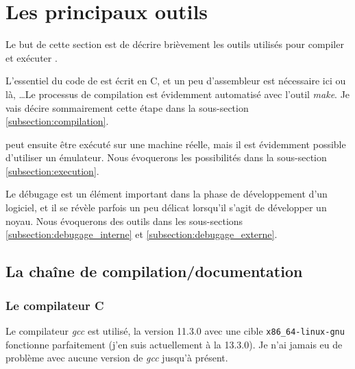 %
\section{Les principaux outils}
\label{section:outils}

   Le but de cette section est de décrire brièvement les outils
utilisés pour compiler et exécuter \manux.

   L'essentiel du code de \manux est écrit en C, et un peu
d'assembleur est nécessaire ici ou là, \ldots Le processus de
compilation est évidemment automatisé avec l'outil {\em make}. Je vais
décire sommairement cette étape dans la sous-section
\ref{subsection:compilation}.

   \manux peut ensuite être exécuté sur une machine réelle, mais il
est évidemment possible d'utiliser un émulateur. Nous évoquerons les
possibilités dans la sous-section \ref{subsection:execution}.

   Le débugage est un élément important dans la phase de développement
d'un logiciel, et il se révèle parfois un peu délicat lorsqu'il s'agit
de développer un noyau. Nous évoquerons des outils dans les
sous-sections \ref{subsection:debugage_interne} et
\ref{subsection:debugage_externe}.


%
\subsection{La chaîne de compilation/documentation}
%
\subsubsection{Le compilateur C}

   Le compilateur \emph{gcc} est utilisé, la version 11.3.0 avec une cible
\lstinline!x86_64-linux-gnu! fonctionne parfaitement (j'en suis
actuellement à la 13.3.0). Je n'ai jamais eu de problème avec aucune
version de \emph{gcc} jusqu'à présent.

